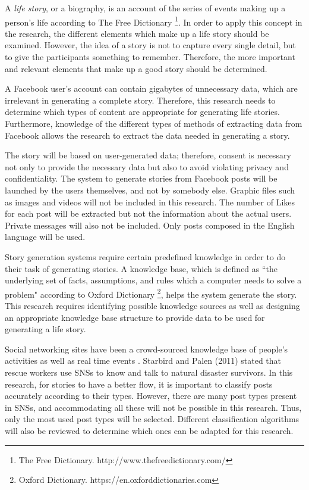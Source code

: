 A \textit{life story}, or a biography, is an account of the series of events making up a person's life according to The Free Dictionary \footnote{The Free Dictionary. http://www.thefreedictionary.com/}. In order to apply this concept in the research, the different elements which make up a life story should be examined. However, the idea of a story is not to capture every single detail, but to give the participants something to remember. Therefore, the more important and relevant elements that make up a good story should be determined.

A Facebook user's account can contain gigabytes of unnecessary data, which are irrelevant in generating a complete story. Therefore, this research needs to determine which types of content are appropriate for generating life stories. Furthermore, knowledge of the different types of methods of extracting data from Facebook allows the research to extract the data needed in generating a story.

The story will be based on user-generated data; therefore, consent is necessary not only to provide the necessary data but also to avoid violating privacy and confidentiality. The system to generate stories from Facebook posts will be launched by the users themselves, and not by somebody else. Graphic files such as images and videos will not be included in this research. The number of Likes for each post will be extracted but not the information about the actual users. Private messages will also not be included. Only posts composed in the English language will be used.

Story generation systems require certain predefined knowledge in order to do their task of generating stories. A knowledge base, which is defined as ``the underlying set of facts, assumptions, and rules which a computer needs to solve a problem" according to Oxford Dictionary \footnote{Oxford Dictionary. https://en.oxforddictionaries.com}, helps the system generate the story. This research requires identifying possible knowledge sources as well as designing an appropriate knowledge base structure to provide data to be used for generating a life story.

Social networking sites have been a crowd-sourced knowledge base of people's activities as well as real time events \cite{Jain2016TowardsAE}. Starbird and Palen (2011) stated that rescue workers use SNSs to know and talk to natural disaster survivors. In this research, for stories to have a better flow, it is important to classify posts accurately according to their types. However, there are many post types present in SNSs, and accommodating all these will not be possible in this research. Thus, only the most used post types will be selected. Different classification algorithms will also be reviewed to determine which ones can be adapted for this research.

